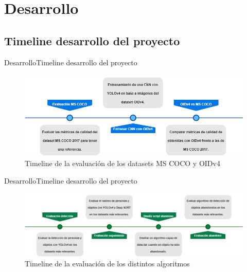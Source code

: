 \section{Desarrollo}

\subsection{Timeline desarrollo del proyecto}

\begin{frame}{Desarrollo}{Timeline desarrollo del proyecto}

\begin{figure}
	\centering
	\includegraphics[width=1\textwidth]{Images/desarrollo/timeline1.png}
    \caption{Timeline de la evaluación de los datasets MS COCO y OIDv4}
\end{figure}
    
\end{frame}


\begin{frame}{Desarrollo}{Timeline desarrollo del proyecto}

\begin{figure}
	\centering
	\includegraphics[width=1\textwidth]{Images/desarrollo/timeline2.png}
    \caption{Timeline de la evaluación de los distintos algoritmos}
\end{figure}
    
\end{frame}


